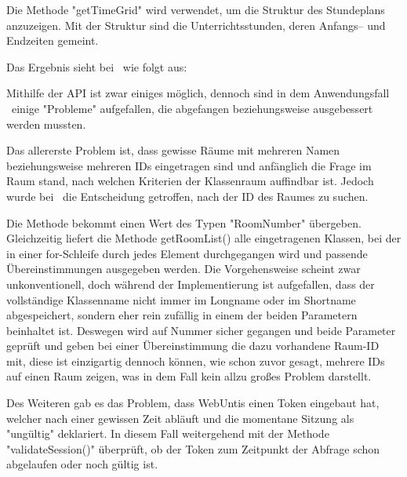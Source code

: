 
\begin{minipage}\textwidth
    Die Methode "getTimeGrid" wird verwendet, um die Struktur des Stundeplans anzuzeigen. Mit der Struktur sind die Unterrichtsstunden, deren Anfangs– und Endzeiten gemeint.


Das Ergebnis sieht bei \ZELIA\ wie folgt aus:


\end{minipage}

\pagebreak
{}

Mithilfe der API ist zwar einiges möglich, dennoch sind in dem Anwendungsfall \ZELIA\ einige "Probleme" aufgefallen, die abgefangen beziehungsweise ausgebessert werden mussten.

Das allererste Problem ist, dass gewisse Räume mit mehreren Namen beziehungsweise mehreren IDs eingetragen sind und anfänglich die Frage im Raum stand, nach welchen Kriterien der Klassenraum auffindbar ist. Jedoch wurde bei \ZELIA\ die Entscheidung getroffen, nach der ID des Raumes zu suchen.



Die Methode bekommt einen Wert des Typen "RoomNumber" übergeben. Gleichzeitig liefert die Methode getRoomList() alle eingetragenen Klassen, bei der in einer for-Schleife durch jedes Element durchgegangen wird und passende Übereinstimmungen ausgegeben werden. Die Vorgehensweise scheint zwar unkonventionell, doch während der Implementierung ist aufgefallen, dass der vollständige Klassenname nicht immer im Longname oder im Shortname abgespeichert, sondern eher rein zufällig in einem der beiden Parametern beinhaltet ist. Deswegen wird auf Nummer sicher gegangen und beide Parameter geprüft und geben bei einer Übereinstimmung die dazu vorhandene Raum-ID mit, diese ist einzigartig dennoch können, wie schon zuvor gesagt, mehrere IDs auf einen Raum zeigen, was in dem Fall kein allzu großes Problem darstellt.

Des Weiteren gab es das Problem, dass WebUntis einen Token eingebaut hat, welcher nach einer gewissen Zeit abläuft und die momentane Sitzung als "ungültig" deklariert. In diesem Fall weitergehend mit der Methode "validateSession()" überprüft, ob der Token zum Zeitpunkt der Abfrage schon abgelaufen oder noch gültig ist. 

